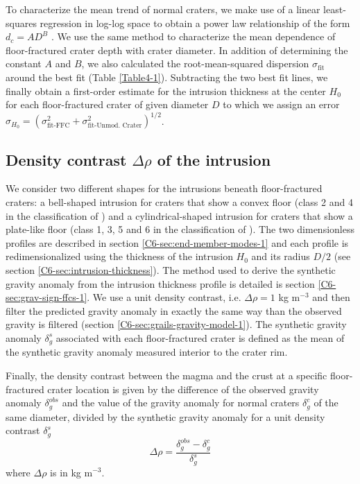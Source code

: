 To characterize  the mean trend  of normal craters,  we make use  of a
linear least-squares regression in log-log space to obtain a power law
relationship of the form $d_c=AD^B$ \citep{Pike:1974ux,Kalynn:2013fg}.
We  use  the  same  method  to characterize  the  mean  dependence  of
floor-fractured  crater depth  with crater  diameter.  In  addition of
determining  the  constant  $A$  and   $B$,  we  also  calculated  the
root-mean-squared dispersion $\sigma_{\text{fit}}$ around the best fit
(Table \ref{Table4-1}).   Subtracting  the  two best  fit
lines,  we finally  obtain a  first-order estimate  for the  intrusion
thickness at the center $H_0$ for each floor-fractured crater of given
diameter     $D$      to     which     we     assign      an     error
$\sigma_{H_0}
=(\sigma_{\text{fit-FFC}}^2+\sigma_{\text{fit-Unmod. Crater}}^2)^{1/2}$.

\subsection{Density contrast $\Delta \rho$ of the intrusion}
\label{C6-sec:intr-dens-contr}

We  consider   two  different   shapes  for  the   intrusions  beneath
floor-fractured craters: a bell-shaped intrusion for craters that show
a   convex  floor   (class  2   and   4  in   the  classification   of
\citet{Schultz:1976kt}) and a cylindrical-shaped intrusion for craters
that  show  a   plate-like  floor  (class  1,  3,  5   and  6  in  the
classification  of  \citet{Schultz:1976kt}).   The  two  dimensionless
profiles  are described  in  section \ref{C6-sec:end-member-modes-1}  and
each profile is redimensionalized using the thickness of the intrusion
$H_0$      and      its       radius      $D/2$      (see      section
\ref{C6-sec:intrusion-thickness}).   The   method  used  to   derive  the
synthetic  gravity anomaly  from  the intrusion  thickness profile  is
detailed is section \ref{C6-sec:grav-sign-ffcs-1}.  We use a unit density
contrast, i.e.   $\Delta \rho  = 1$  kg m$^{-3}$  and then  filter the
predicted gravity  anomaly in exactly  the same way than  the observed
gravity is  filtered (section  \ref{C6-sec:grails-gravity-model-1}).  The
synthetic   gravity   anomaly   $\delta_g^s$  associated   with   each
floor-fractured crater is defined as the mean of the synthetic gravity
anomaly measured interior to the crater rim.
  
Finally, the  density contrast between  the magma  and the crust  at a
specific floor-fractured crater location is given by the difference of
the observed  gravity anomaly  $\delta_g^{obs}$ and  the value  of the
gravity anomaly for normal craters  $\delta_g^c$ of the same diameter,
divided by the  synthetic gravity anomaly for a  unit density contrast
$\delta_g^s$
\begin{equation}
  \Delta \rho = \frac{\delta_{g}^{obs}-\delta_{g}^c}{\delta_{g}^{s}}
\end{equation}
where $\Delta \rho$ is in kg m$^{-3}$.

